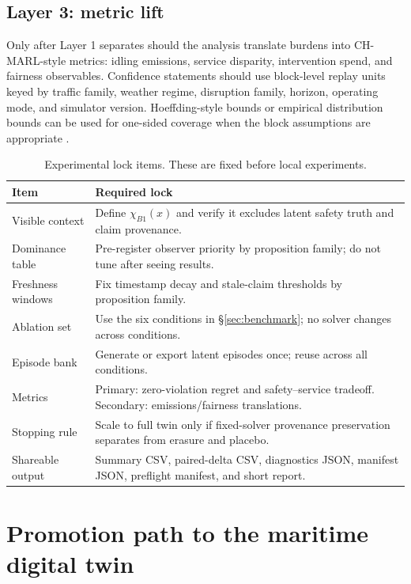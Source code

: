 \documentclass[11pt]{article}
\newcommand{\1}{\mathbf{1}}
\theoremstyle{definition}
\theoremstyle{plain}
\theoremstyle{remark}
\begin{document}
\subsection{Layer 3: metric lift}

Only after Layer 1 separates should the analysis translate burdens into CH-MARL-style metrics: idling emissions, service disparity, intervention spend, and fairness observables. Confidence statements should use block-level replay units keyed by traffic family, weather regime, disruption family, horizon, operating mode, and simulator version. Hoeffding-style bounds or empirical distribution bounds can be used for one-sided coverage when the block assumptions are appropriate \citep{Hoeffding1963,Massart1990}.

\begin{table}[H]
\centering
\caption{Experimental lock items. These are fixed before local experiments.}
\label{tab:prerun}
\small
\begin{tabularx}{\textwidth}{@{}L{0.30\textwidth}Y@{}}
\toprule
Item & Required lock \\
\midrule
Visible context & Define $\chi_{B1}(x)$ and verify it excludes latent safety truth and claim provenance. \\
Dominance table & Pre-register observer priority by proposition family; do not tune after seeing results. \\
Freshness windows & Fix timestamp decay and stale-claim thresholds by proposition family. \\
Ablation set & Use the six conditions in \S\ref{sec:benchmark}; no solver changes across conditions. \\
Episode bank & Generate or export latent episodes once; reuse across all conditions. \\
Metrics & Primary: zero-violation regret and safety--service tradeoff. Secondary: emissions/fairness translations. \\
Stopping rule & Scale to full twin only if fixed-solver provenance preservation separates from erasure and placebo. \\
Shareable output & Summary CSV, paired-delta CSV, diagnostics JSON, manifest JSON, preflight manifest, and short report. \\
\bottomrule
\end{tabularx}
\end{table}


\section{Promotion path to the maritime digital twin}
\label{sec:twin-promotion}
\end{document}
